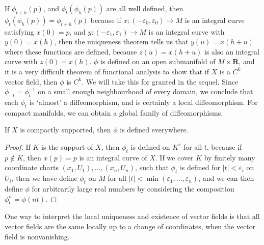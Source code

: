 If $\phi_{t+h}(p)$, and $\phi_t(\phi_h(p))$ are all well defined, then $\phi_t(\phi_h(p)) = \phi_{t + h}(p)$ because if $x: (-\varepsilon_0,\varepsilon_0) \to M$ is an integral curve satisfying $x(0) = p$, and $y: (-\varepsilon_1, \varepsilon_1) \to M$ is an integral curve with $y(0) = x(h)$, then the uniqueness theorem tells us that $y(u) = x(h + u)$ where these functions are defined, because $z(u) = x(h + u)$ is also an integral curve with $z(0) = x(h)$. $\phi$ is defined on an open submanifold of $M \times \mathbf{R}$, and it is a very difficult theorem of functional analysis to show that if $X$ is a $C^k$ vector field, then $\phi$ is $C^k$. We will take this for granted in the sequel. Since $\phi_{-t} = \phi_t^{-1}$ on a small enough neighbourhood of every domain, we conclude that each $\phi_t$ is `almost' a diffeomorphism, and is certainly a local diffeomorphism. For compact manifolds, we can obtain a global family of diffeomorphisms.

\begin{theorem}
    If $X$ is compactly supported, then $\phi$ is defined everywhere.
\end{theorem}
\begin{proof}
    If $K$ is the support of $X$, then $\phi_t$ is defined on $K^c$ for all $t$, because if $p \not \in K$, then $x(p) = p$ is an integral curve of $X$. If we cover $K$ by finitely many coordinate charts $(x_1,U_1), \dots, (x_n,U_n)$, such that $\phi_t$ is defined for $|t| < \varepsilon_i$ on $U_i$, then we have define $\phi_t$ on $M$ for all $|t| < \min(\varepsilon_1, \dots, \varepsilon_n)$, and we can then define $\phi$ for arbitrarily large real numbers by considering the composition $\phi^n_t = \phi(nt)$.
\end{proof}

One way to interpret the local uniqueness and existence of vector fields is that all vector fields are the same locally up to a change of coordinates, when the vector field is nonvanishing.

